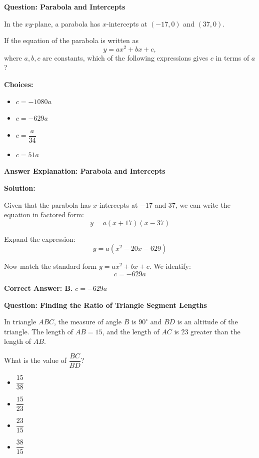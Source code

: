 \documentclass{beamer}
\begin{document}
\begin{frame}{\textbf{Question: Parabola and Intercepts}}

In the \( xy \)-plane, a parabola has \( x \)-intercepts at \( (-17, 0) \) and \( (37, 0) \).

If the equation of the parabola is written as
\[
y = ax^2 + bx + c,
\]
where \( a, b, c \) are constants, which of the following expressions gives \( c \) in terms of \( a \)?

\textbf{Choices:}
\begin{itemize}
    \item[A.] \( c = -1080a \)
    \item[B.] \( c = -629a \)
    \item[C.] \( c = \dfrac{a}{34} \)
    \item[D.] \( c = 51a \)
\end{itemize}

\end{frame}


\begin{frame}{\textbf{Answer Explanation: Parabola and Intercepts}}

\textbf{Solution:}

Given that the parabola has \( x \)-intercepts at \( -17 \) and \( 37 \), we can write the equation in factored form:
\[
y = a(x + 17)(x - 37)
\]

Expand the expression:
\[
y = a(x^2 - 20x - 629)
\]

Now match the standard form \( y = ax^2 + bx + c \). We identify:
\[
c = -629a
\]

\textbf{Correct Answer: B.} \( \boxed{c = -629a} \)

\end{frame}


\begin{frame}{\textbf{Question: Finding the Ratio of Triangle Segment Lengths}}

In triangle \( ABC \), the measure of angle \( B \) is \( 90^\circ \) and \( BD \) is an altitude of the triangle.  
The length of \( AB = 15 \), and the length of \( AC \) is 23 greater than the length of \( AB \).  

\medskip

What is the value of \( \dfrac{BC}{BD} \)?

\begin{itemize}
    \item[A.] \( \dfrac{15}{38} \)
    \item[B.] \( \dfrac{15}{23} \)
    \item[C.] \( \dfrac{23}{15} \)
    \item[D.] \( \dfrac{38}{15} \)
\end{itemize}

\end{frame}
\end{document}
